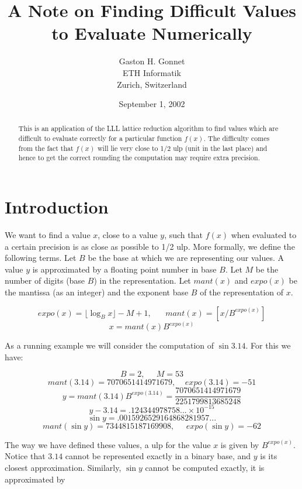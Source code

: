 \documentclass{article}
\title{A Note on Finding Difficult Values \\
to Evaluate Numerically}
\author{Gaston H. Gonnet \\
ETH Informatik \\
Zurich, Switzerland}
\date{September 1, 2002}
\begin{document}
\maketitle

\begin{abstract}
This is an application of the LLL lattice reduction algorithm
to find values which are difficult to evaluate correctly
for a particular function $f(x)$.
The difficulty comes from the fact that $f(x)$ will lie very
close to 1/2 ulp (unit in the last place) and hence to get the
correct rounding the computation may require extra precision.
\end{abstract}

\section{Introduction}

We want to find a value $x$, close to a value $y$, such
that $f(x)$ when evaluated to a certain precision is as
close as possible to 1/2 ulp.
More formally, we define the following terms.
Let $B$ be the base at which we are representing our values.
A value $y$ is approximated by a floating point number in base $B$.
Let $M$ be the number of digits (base $B$) in the representation.
Let $mant(x)$ and $expo(x)$ be the mantissa (as an integer) and
the exponent base $B$ of the representation of $x$.

\[ expo(x) = \lfloor \log_B x \rfloor - M + 1, \;\;\;\;\;\;
   mant(x) = [ x / B^{expo(x)} ] \]
\[ x = mant(x) B^{expo(x)} \]

As a running example we will consider the computation of
$\sin 3.14$.  For this we have:

\[ B = 2, \;\;\;\;\; M=53 \]
\[ mant(3.14) = 7070651414971679, \;\;\;\; expo(3.14) = -51 \]
\[ y = mant(3.14)B^{expo(3.14)} = \frac{7070651414971679}{2251799813685248} \]
\[ y-3.14 = .124344978758... \times 10^{-15} \]
\[ \sin y = .0015926529164868281957... \]
\[ mant( \sin y ) = 7344815187169908, \;\;\;\;\; expo( \sin y )= -62 \]

The way we have defined these values, a ulp for the value $x$ is
given by $B^{expo(x)}$.
Notice that $3.14$ cannot be represented exactly in a binary base,
and $y$ is its closest approximation.
Similarly, $\sin y$ cannot be computed exactly, it is approximated by
\end{document}
